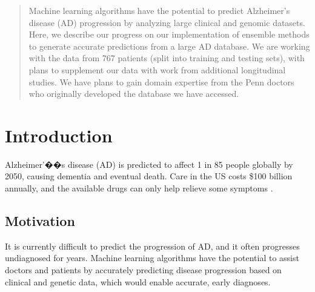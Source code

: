 \documentclass{article}
\begin{document}
 


\begin{abstract} 
Machine learning algorithms have the potential to predict Alzheimer's disease (AD) progression by analyzing large clinical and genomic datasets. Here, we describe our progress on our implementation of ensemble methods to generate accurate predictions from a large AD database. We are working with the data from 767 patients (split into training and testing sets), with plans to supplement our data with work from additional longitudinal studies. We have plans to gain domain expertise from the Penn doctors who originally developed the database we have accessed.


\end{abstract} 



\section{Introduction}
Alzheimer'��s disease (AD) is predicted to affect 1 in 85 people globally by 2050, causing dementia and eventual death. Care in the US costs \$100 billion annually, and the available drugs can only help relieve some symptoms \cite{duthey13}.

\subsection{Motivation}
It is currently difficult to predict the progression of AD, and it often progresses undiagnosed for years. Machine learning algorithms have the potential to assist doctors and patients by accurately predicting disease progression based on clinical and genetic data, which would enable accurate, early diagnoses.
\end{document}
